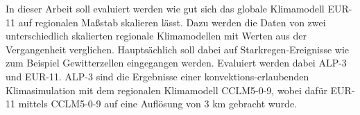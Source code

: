 In dieser Arbeit soll evaluiert werden wie gut sich das globale Klimamodell EUR-11 auf regionalen Maßstab skalieren lässt. Dazu werden die Daten von zwei unterschiedlich skalierten regionale Klimamodellen mit Werten aus der Vergangenheit verglichen. Hauptsächlich soll dabei auf Starkregen-Ereignisse wie zum Beispiel Gewitterzellen eingegangen werden. Evaluiert werden dabei ALP-3 und EUR-11. ALP-3 sind  die Ergebnisse einer \glqq konvektions-erlaubenden\grqq{} Klimasimulation mit dem regionalen Klimamodell CCLM5-0-9, wobei dafür EUR-11 mittels CCLM5-0-9 auf eine Auflösung von 3 km gebracht wurde.